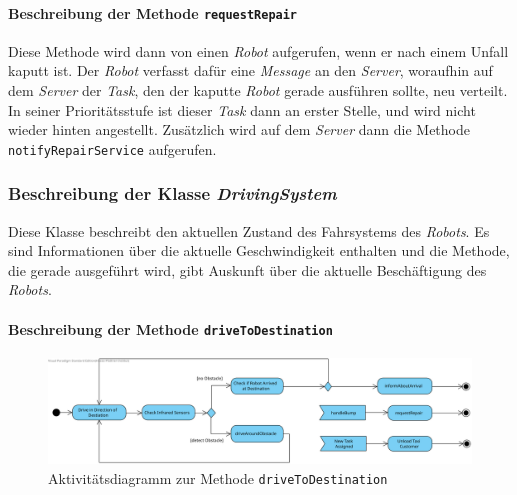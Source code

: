 			\paragraph{Beschreibung der Methode \texttt{requestRepair}}
			Diese Methode wird dann von einen \textit{Robot} aufgerufen, wenn er nach einem Unfall kaputt ist. Der \textit{Robot} verfasst dafür eine \textit{Message} an den \textit{Server}, woraufhin auf dem \textit{Server} der \textit{Task}, den der kaputte \textit{Robot} gerade ausführen sollte, neu verteilt. In seiner Prioritätsstufe ist dieser \textit{Task} dann an erster Stelle, und wird nicht wieder hinten angestellt. Zusätzlich wird auf dem \textit{Server} dann die Methode \texttt{notifyRepairService} aufgerufen.		
			
	\subsubsection{Beschreibung der Klasse \textit{DrivingSystem}}
		
		Diese Klasse beschreibt den aktuellen Zustand des Fahrsystems des \textit{Robots}. 
		Es sind Informationen über die aktuelle Geschwindigkeit enthalten und die Methode, 
		die gerade ausgeführt wird, gibt Auskunft über die aktuelle Beschäftigung des \textit{Robots}.

			\paragraph{Beschreibung der Methode \texttt{driveToDestination}}
			\begin{figure}[H]
			\centering
			\includegraphics[width=1\textwidth]{img/7-1-methode_driveToDestination}
			\caption{Aktivitätsdiagramm zur Methode \texttt{driveToDestination}}
			\label{AktivitaetDriveToDestination}
			\end{figure}

